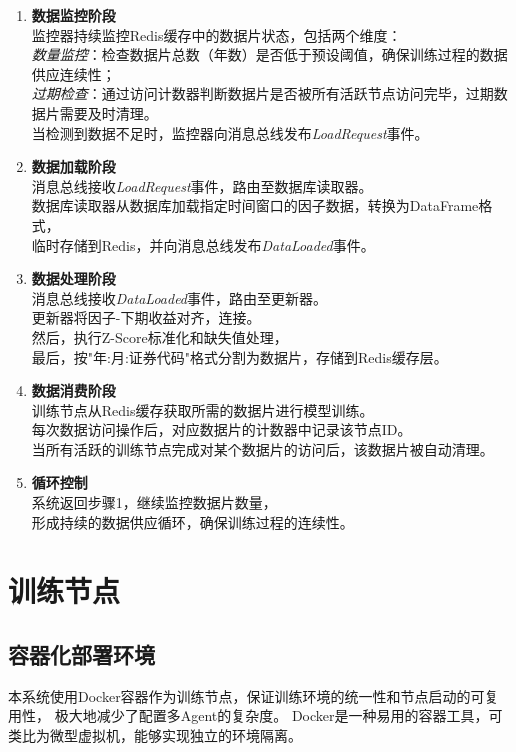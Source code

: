 \begin{enumerate}
    \item \textbf{数据监控阶段} \\
    监控器持续监控Redis缓存中的数据片状态，包括两个维度： \\
    \textit{数量监控}：检查数据片总数（年数）是否低于预设阈值，确保训练过程的数据供应连续性； \\
    \textit{过期检查}：通过访问计数器判断数据片是否被所有活跃节点访问完毕，过期数据片需要及时清理。 \\
    当检测到数据不足时，监控器向消息总线发布\textit{LoadRequest}事件。

    \item \textbf{数据加载阶段} \\
    消息总线接收\textit{LoadRequest}事件，路由至数据库读取器。 \\
    数据库读取器从数据库加载指定时间窗口的因子数据，转换为DataFrame格式， \\
    临时存储到Redis，并向消息总线发布\textit{DataLoaded}事件。

    \item \textbf{数据处理阶段} \\
    消息总线接收\textit{DataLoaded}事件，路由至更新器。 \\
    更新器将因子-下期收益对齐，连接。\\
    然后，执行Z-Score标准化和缺失值处理， \\
    最后，按"年:月:证券代码"格式分割为数据片，存储到Redis缓存层。

    \item \textbf{数据消费阶段} \\
    训练节点从Redis缓存获取所需的数据片进行模型训练。 \\
    每次数据访问操作后，对应数据片的计数器中记录该节点ID。 \\
    当所有活跃的训练节点完成对某个数据片的访问后，该数据片被自动清理。

    \item \textbf{循环控制} \\
    系统返回步骤1，继续监控数据片数量， \\
    形成持续的数据供应循环，确保训练过程的连续性。
\end{enumerate}

\section{训练节点}
\subsection{容器化部署环境}
本系统使用Docker容器作为训练节点，保证训练环境的统一性和节点启动的可复用性，
极大地减少了配置多Agent的复杂度。
Docker是一种易用的容器工具，可类比为微型虚拟机，能够实现独立的环境隔离。

